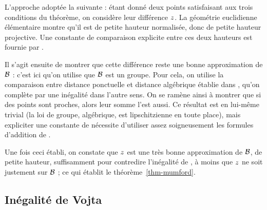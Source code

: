 L'approche adoptée la suivante : étant donné deux points satisfaisant aux
trois conditions du théorème, on considère leur différence $z$. La
géométrie euclidienne élémentaire montre qu'il est de petite hauteur
normalisée, donc de petite hauteur projective. Une constante de comparaison
explicite entre ces deux hauteurs est fournie par \cite{daphiminvaii}.

Il s'agit ensuite de montrer que cette différence reste une bonne
approximation de $\mathcal B$ : c'est ici qu'on utilise que $\mathcal B$ est un groupe.
Pour cela, on utilise la comparaison entre distance ponctuelle et distance
algébrique établie dans \cite[p. 103]{pphdg}, qu'on complète par une inégalité
dans l'autre sens.  On se ramène ainsi à montrer que si des points sont
proches, alors leur somme l'est aussi. Ce résultat est en lui-même trivial (la
loi de groupe, algébrique, est lipschitzienne en toute place), mais expliciter
une constante de  nécessite d'utiliser assez soigneusement les
formules d'addition de \cite{daphiminvaii}.

Une fois ceci établi, on constate que $z$ est une très bonne
approximation de $\mathcal B$, de petite hauteur, suffisamment pour contredire
l'inégalité de , à moins que $z$ ne soit justement sur
$\mathcal B$ ; ce qui établit le théorème~\ref{thm-mumford}.

\subsection{Inégalité de Vojta}

